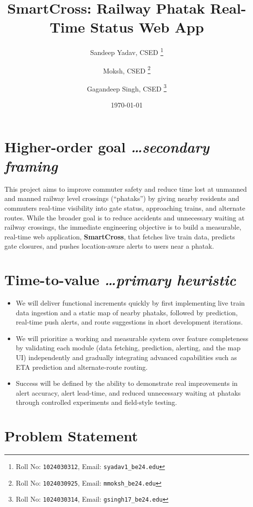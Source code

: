 \documentclass[11pt,a4paper]{article}
\title{SmartCross: Railway Phatak Real-Time Status Web App}
\author{
  Sandeep Yadav, CSED%
  \thanks{Roll No: \texttt{1024030312}, %
    Email: \texttt{syadav1\_be24\@thapar.edu}}
  \and 
  Moksh, CSED%
  \thanks{Roll No: \texttt{1024030925}, %
    Email: \texttt{mmoksh\_be24\@thapar.edu}}
  \and 
  Gagandeep Singh, CSED%
  \thanks{Roll No: \texttt{1024030314}, %
    Email: \texttt{gsingh17\_be24\@thapar.edu}}
}
\date{\today}
\newcommand{\BvrHint}[1]{%
  {\normalfont\normalsize\itshape\hfill #1}}
\begin{document}
\maketitle

\section{Higher-order goal%
  \BvrHint{\ldots secondary framing}}
This project aims to improve commuter safety and reduce time lost at unmanned and manned railway level crossings (``phataks'') by giving nearby residents and commuters real-time visibility into gate status, approaching trains, and alternate routes. While the broader goal is to reduce accidents and unnecessary waiting at railway crossings, the immediate engineering objective is to build a measurable, real-time web application, \textbf{SmartCross}, that fetches live train data, predicts gate closures, and pushes location-aware alerts to users near a phatak.

\section{Time-to-value %
\BvrHint{\ldots primary heuristic}}
\begin{itemize}[leftmargin=0.7cm]
     \item We will deliver functional increments quickly by first implementing live train data ingestion and a static map of nearby phataks, followed by prediction, real-time push alerts, and route suggestions in short development iterations.

    \item We will prioritize a working and measurable system over feature completeness by validating each module (data fetching, prediction, alerting, and the map UI) independently and gradually integrating advanced capabilities such as ETA prediction and alternate-route routing.

    \item Success will be defined by the ability to demonstrate real improvements in alert accuracy, alert lead-time, and reduced unnecessary waiting at phataks through controlled experiments and field-style testing.
\end{itemize}

\section{Problem Statement}
\end{document}

